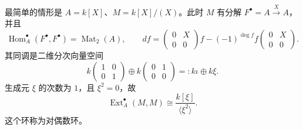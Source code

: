 \begin{example}[对偶数环]\label{ex:dual-numbers-ext}
最简单的情形是 $A=k[X]$、$M=k[X]/(X)$。此时 $M$ 有分解 $F^\bullet=A\xrightarrow{X}A$，并且
\[
  \operatorname{Hom}_A^\bullet(F^\bullet,F^\bullet)=\operatorname{Mat}_2(A),
  \qquad
  df=\begin{pmatrix}0&X\\0&0\end{pmatrix}f
       -(-1)^{\deg f}f\begin{pmatrix}0&X\\0&0\end{pmatrix}.
\]
其同调是二维分次向量空间
\[
  k\begin{pmatrix}1&0\\0&1\end{pmatrix}
  \oplus k\begin{pmatrix}0&1\\0&0\end{pmatrix}
  =:k\iota\oplus k\xi.
\]
生成元 $\xi$ 的次数为 $1$，且 $\xi^2=0$，故
\[
  \operatorname{Ext}_A^\bullet(M,M)\cong\frac{k[\xi]}{\langle\xi^2\rangle}.
\]
这个环称为对偶数环。
\end{example}

